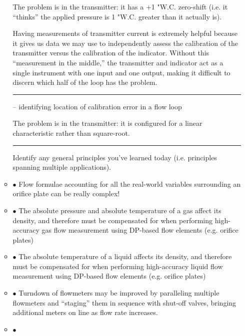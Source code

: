 \begin{itemize}
\begin{itemize}
The problem is in the transmitter: it has a +1 "W.C. zero-shift (i.e. it ``thinks'' the applied pressure is 1 "W.C. greater than it actually is).

\vskip 10pt

Having measurements of transmitter current is extremely helpful because it gives us data we may use to independently assess the calibration of the transmitter versus the calibration of the indicator.  Without this ``measurement in the middle,'' the transmitter and indicator act as a single instrument with one input and one output, making it difficult to discern which half of the loop has the problem.

\filbreak \vskip 5pt \hrule \vskip 5pt  -- identifying location of calibration error in a flow loop \vskip 10pt

The problem is in the transmitter: it is configured for a linear characteristic rather than square-root.


\filbreak \vskip 5pt \hrule \vskip 5pt  \vskip 10pt

\noindent
Identify any general principles you've learned today (i.e. principles spanning multiple applications).
\item{$\bullet$} Flow formulae accounting for all the real-world variables surrounding an orifice plate can be really complex!
\item{$\bullet$} The absolute pressure and absolute temperature of a gas affect its density, and therefore must be compensated for when performing high-accuracy gas flow measurement using DP-based flow elements (e.g. orifice plates)
\item{$\bullet$} The absolute temperature of a liquid affects its density, and therefore must be compensated for when performing high-accuracy liquid flow measurement using DP-based flow elements (e.g. orifice plates)
\item{$\bullet$} Turndown of flowmeters may be improved by paralleling multiple flowmeters and ``staging'' them in sequence with shut-off valves, bringing additional meters on line as flow rate increases.
\item{$\bullet$} 
\medskip


\end{itemize}
\end{itemize}
